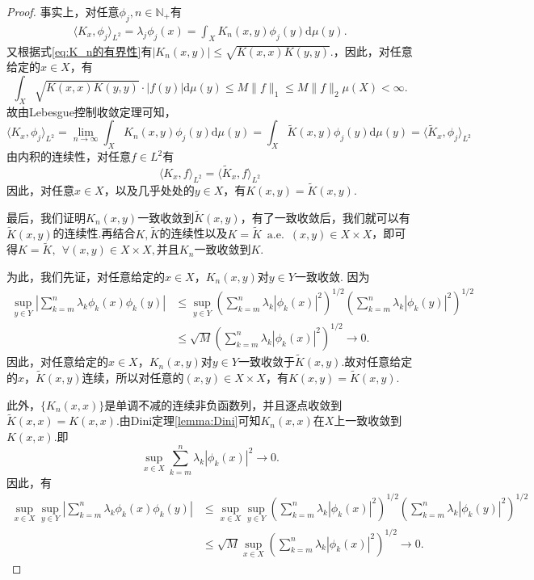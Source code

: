 \documentclass[../master.tex]{subfiles}
\begin{document}
\begin{proof}
事实上，对任意$\phi_j,n\in\mathbb{N}_+$有
\begin{align*}
    \langle K_x,\phi_j\rangle_{L^2 } = \lambda_j \phi_j(x) = \int_{X}K_n(x,y)\phi_j(y)\mathrm{d}\mu (y).
\end{align*}
又根据式\eqref{eq:K_n的有界性}有$|K_n(x,y)|\leq \sqrt{K(x,x)K(y,y)}.$，因此，对任意给定的$x\in X$，有
\begin{equation*}
    \int_{X} \sqrt{K(x,x)K(y,y)}\cdot |f(y)|\mathrm{d}\mu(y)\leq M \|f\|_1\leq M\|f\|_2 \mu(X)<\infty.
\end{equation*}
故由Lebesgue控制收敛定理可知，
\begin{equation*}
    \langle K_x,\phi_j\rangle_{L^2} = \lim_{n\to\infty}\int_{X}K_n(x,y)\phi_j(y)\mathrm{d}\mu (y) = \int_{X}\widetilde{K}(x,y)\phi_j(y)\mathrm{d}\mu(y) = \langle \widetilde{K}_x,\phi_j\rangle_{L^2}
\end{equation*}
由内积的连续性，对任意$f\in L^2$有
\begin{equation*}
    \langle K_x,f\rangle_{L^2}=\langle \widetilde{K}_x,f\rangle_{L^2}
\end{equation*}
因此，对任意$x\in X$，以及几乎处处的$y\in X$，有$K(x,y)= \widetilde{K}(x,y).$


最后，我们证明$K_n(x,y)$一致收敛到$\widetilde{K}(x,y)$，有了一致收敛后，我们就可以有$\widetilde{K}(x,y)$的连续性.再结合$K,\widetilde{K}$的连续性以及$K = \widetilde{K}~\operatorname{a.e.} ~(x,y)\in X\times X$，即可得$K=\widetilde{K},~~\forall (x,y)\in X\times X,$并且$K_n$一致收敛到$K.$

为此，我们先证，对任意给定的$x\in X$，$K_n(x,y)$对$y\in Y$一致收敛.
因为
\begin{align*}
    \sup_{y\in Y} |\sum_{k=m}^n \lambda_k\phi_k(x)\phi_k(y)|&\leq \sup_{y\in Y}\left( \sum_{k=m}^n\lambda_k|\phi_k(x)|^2\right)^{1/2}\left( \sum_{k=m}^n\lambda_k|\phi_k(y)|^2\right)^{1/2}\\
    &\leq \sqrt M \left( \sum_{k=m}^n\lambda_k|\phi_k(x)|^2\right)^{1/2}\to 0.
\end{align*}
因此，对任意给定的$x\in X$，$K_n(x,y)$对$y\in Y$一致收敛于$\widetilde{K}(x,y).$故对任意给定的$x$，$\widetilde{K}(x,y)$连续，所以对任意的$(x,y)\in X\times X$，有$K(x,y)=\widetilde{K}(x,y).$

此外，$\{K_n(x,x)\}$是单调不减的连续非负函数列，并且逐点收敛到$\widetilde{K}(x,x)=K(x,x)$.由Dini定理\ref{lemma:Dini}可知$K_n(x,x)$在$X$上一致收敛到$K(x,x).$即
\begin{equation*}
    \sup_{x\in X}\sum_{k=m}^n \lambda_k|\phi_k(x)|^2\to 0.
\end{equation*}
因此，有
\begin{align*}
    \sup_{x\in X}\sup_{y\in Y} |\sum_{k=m}^n \lambda_k\phi_k(x)\phi_k(y)|&\leq \sup_{x\in X}\sup_{y\in Y}\left( \sum_{k=m}^n\lambda_k|\phi_k(x)|^2\right)^{1/2}\left( \sum_{k=m}^n\lambda_k|\phi_k(y)|^2\right)^{1/2}\\
    &\leq \sqrt M \sup_{x\in X}\left( \sum_{k=m}^n\lambda_k|\phi_k(x)|^2\right)^{1/2}\to 0.
\end{align*}
\end{proof}
\end{document}
